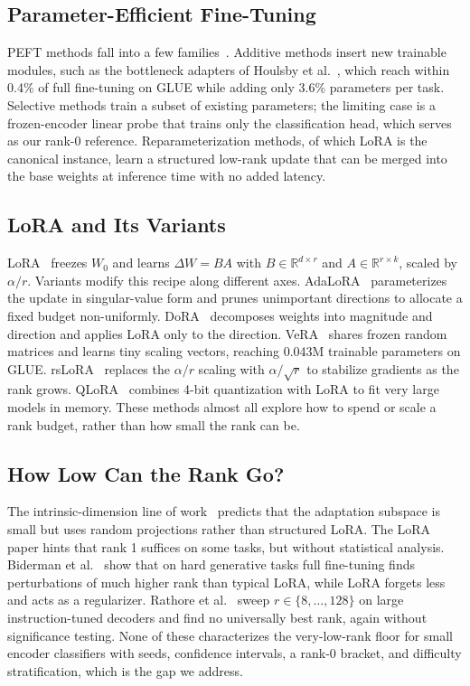 \documentclass[conference]{IEEEtran}
\begin{document}
\subsection{Parameter-Efficient Fine-Tuning}
PEFT methods fall into a few families~\cite{lialin2023scaling,xin2024survey}. Additive methods insert new trainable modules, such as the bottleneck adapters of Houlsby et al.~\cite{houlsby2019adapter}, which reach within 0.4\% of full fine-tuning on GLUE while adding only 3.6\% parameters per task. Selective methods train a subset of existing parameters; the limiting case is a frozen-encoder linear probe that trains only the classification head, which serves as our rank-0 reference. Reparameterization methods, of which LoRA is the canonical instance, learn a structured low-rank update that can be merged into the base weights at inference time with no added latency.

\subsection{LoRA and Its Variants}
LoRA~\cite{hu2021lora} freezes $W_0$ and learns $\Delta W = BA$ with $B \in \mathbb{R}^{d \times r}$ and $A \in \mathbb{R}^{r \times k}$, scaled by $\alpha/r$. Variants modify this recipe along different axes. AdaLoRA~\cite{zhang2023adalora} parameterizes the update in singular-value form and prunes unimportant directions to allocate a fixed budget non-uniformly. DoRA~\cite{liu2024dora} decomposes weights into magnitude and direction and applies LoRA only to the direction. VeRA~\cite{kopiczko2023vera} shares frozen random matrices and learns tiny scaling vectors, reaching 0.043M trainable parameters on GLUE. rsLoRA~\cite{kalajdzievski2023rslora} replaces the $\alpha/r$ scaling with $\alpha/\sqrt{r}$ to stabilize gradients as the rank grows. QLoRA~\cite{dettmers2023qlora} combines 4-bit quantization with LoRA to fit very large models in memory. These methods almost all explore how to spend or scale a rank budget, rather than how small the rank can be.

\subsection{How Low Can the Rank Go?}
The intrinsic-dimension line of work~\cite{li2018intrinsic,aghajanyan2020intrinsic} predicts that the adaptation subspace is small but uses random projections rather than structured LoRA. The LoRA paper hints that rank 1 suffices on some tasks, but without statistical analysis. Biderman et al.~\cite{biderman2024lora} show that on hard generative tasks full fine-tuning finds perturbations of much higher rank than typical LoRA, while LoRA forgets less and acts as a regularizer. Rathore et al.~\cite{rathore2025rank} sweep $r \in \{8,\dots,128\}$ on large instruction-tuned decoders and find no universally best rank, again without significance testing. None of these characterizes the very-low-rank floor for small encoder classifiers with seeds, confidence intervals, a rank-0 bracket, and difficulty stratification, which is the gap we address.
\end{document}
